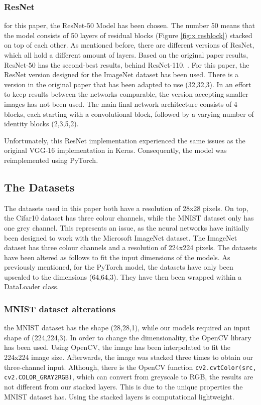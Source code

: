 \documentclass[conference]{IEEEtran}
\begin{document}
\subsubsection{ResNet}
for this paper, the ResNet-50 Model has been chosen. 
The number 50 means that the model consists of 50 layers of residual blocks (Figure \ref{fig:x resblock}) stacked on top of each other. 
As mentioned before, there are different versions of ResNet, which all hold a different amount of layers. 
Based on the original paper results, ResNet-50 has the second-best results, behind ResNet-110. \cite{he_deep_2015}.  
For this paper, the ResNet version designed for the ImageNet dataset has been used. There is a version in the original paper that has been adapted to use (32,32,3). 
In an effort to keep results between the networks comparable, the version accepting smaller images has not been used.
The main final network architecture consists of 4 blocks, each starting with a convolutional block, followed by a varying number of identity blocks (2,3,5,2).

Unfortunately, this ResNet implementation experienced the same issues as the original VGG-16 implementation in Keras. Consequently, the model was reimplemented using PyTorch.

\subsection{The Datasets}\label{ID}

The datasets used in this paper both have a resolution of 28x28 pixels. 
On top, the Cifar10 dataset has three colour channels, while the MNIST dataset only has one grey channel.
This represents an issue, as the neural networks have initially been designed to work with the Microsoft ImageNet dataset. 
The ImageNet dataset has three colour channels and a resolution of 224x224 pixels.
The datasets have been altered as follows to fit the input dimensions of the models.
As previously mentioned, for the PyTorch model, the datasets have only been upscaled to the dimensions (64,64,3).
They have then been wrapped within a DataLoader class.

\subsubsection{MNIST dataset alterations}
the MNIST dataset has the shape (28,28,1), while our models required an input shape of (224,224,3). 
In order to change the dimensionality, the OpenCV library has been used. Using OpenCV, the image has been interpolated to fit the 224x224 image size. 
Afterwards, the image was stacked three times to obtain our three-channel input. Although, there is the OpenCV function \verb|cv2.cvtColor(src, cv2.COLOR_GRAY2RGB)|, 
which can convert from greyscale to RGB, the results are not different from our stacked layers. 
This is due to the unique properties the MNIST dataset has. Using the stacked layers is computational lightweight.
\end{document}
